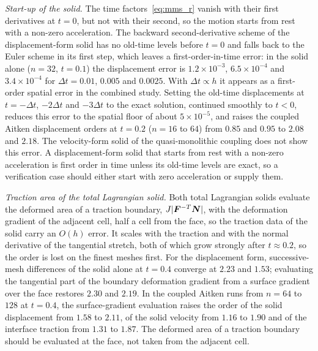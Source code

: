 \emph{Start-up of the solid.}
The time factors~\eqref{eq:mms_r} vanish with their first derivatives at $t = 0$, but not with their second, so the motion starts from rest with a non-zero acceleration.
The backward second-derivative scheme of the displacement-form solid has no old-time levels before $t = 0$ and falls back to the Euler scheme in its first step, which leaves a first-order-in-time error: in the solid alone ($n = 32$, $t = 0.1$) the displacement error is $1.2\times10^{-3}$, $6.5\times10^{-4}$ and $3.4\times10^{-4}$ for $\Delta t = 0.01$, $0.005$ and $0.0025$.
With $\Delta t \propto h$ it appears as a first-order spatial error in the combined study.
Setting the old-time displacements at $t = -\Delta t$, $-2\Delta t$ and $-3\Delta t$ to the exact solution, continued smoothly to $t < 0$, reduces this error to the spatial floor of about $5\times10^{-5}$, and raises the coupled Aitken displacement orders at $t = 0.2$ ($n = 16$ to $64$) from $0.85$ and $0.95$ to $2.08$ and $2.18$.
The velocity-form solid of the quasi-monolithic coupling does not show this error.
A displacement-form solid that starts from rest with a non-zero acceleration is first order in time unless its old-time levels are exact, so a verification case should either start with zero acceleration or supply them.

\emph{Traction area of the total Lagrangian solid.}
Both total Lagrangian solids evaluate the deformed area of a traction boundary, $J|\boldsymbol{F}^{-T}\boldsymbol{N}|$, with the deformation gradient of the adjacent cell, half a cell from the face, so the traction data of the solid carry an $O(h)$ error.
It scales with the traction and with the normal derivative of the tangential stretch, both of which grow strongly after $t \approx 0.2$, so the order is lost on the finest meshes first.
For the displacement form, successive-mesh differences of the solid alone at $t = 0.4$ converge at $2.23$ and $1.53$; evaluating the tangential part of the boundary deformation gradient from a surface gradient over the face restores $2.30$ and $2.19$.
In the coupled Aitken runs from $n = 64$ to $128$ at $t = 0.4$, the surface-gradient evaluation raises the order of the solid displacement from $1.58$ to $2.11$, of the solid velocity from $1.16$ to $1.90$ and of the interface traction from $1.31$ to $1.87$.
The deformed area of a traction boundary should be evaluated at the face, not taken from the adjacent cell.

